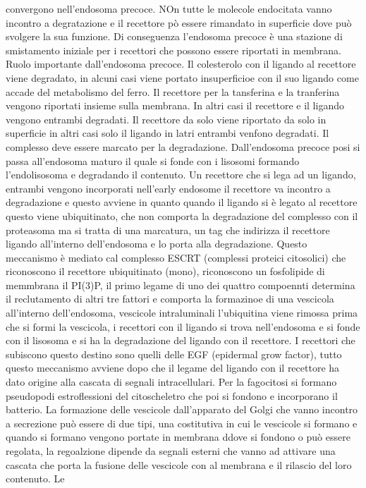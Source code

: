convergono nell'endosoma precoce. NOn tutte le molecole endocitata vanno incontro a degratazione e il recettore p\`o essere rimandato in superficie dove pu\`o svolgere la sua funzione.
Di conseguenza l'endosoma precoce \`e una stazione di smistamento iniziale per i recettori che possono essere riportati in membrana. Ruolo importante dall'endosoma precoce. Il
colesterolo con il ligando al recettore viene degradato, in alcuni casi viene portato insuperficioe con il suo ligando come accade del metabolismo del ferro. Il recettore per la 
tansferina e la tranferina vengono riportati insieme sulla membrana. In altri casi il recettore e il ligando vengono entrambi degradati. Il recettore da solo viene riportato da solo
in superficie in altri casi solo il ligando in latri entrambi venfono degradati. Il complesso deve essere marcato per la degradazione. Dall'endosoma precoce posi si passa all'endosoma 
maturo il quale si fonde con i lisosomi formando l'endolisosoma e degradando il contenuto. Un recettore che si lega ad un ligando, entrambi vengono incorporati nell'early endosome il
recettore va incontro a degradazione e questo avviene in quanto quando il ligando si \`e legato al recettore questo viene ubiquitinato, che non comporta la degradazione del complesso 
con il proteasoma ma si tratta di una marcatura, un tag che indirizza il recettore ligando all'interno dell'endosoma e lo porta alla degradazione. Questo meccanismo \`e mediato cal
complesso ESCRT (complessi proteici citosolici) che riconoscono il recettore ubiquitinato (mono), riconoscono un fosfolipide di memmbrana il PI(3)P, il primo legame di uno dei quattro 
compoennti determina il reclutamento di altri tre fattori e comporta la formazinoe di una vescicola all'interno dell'endosoma, vescicole intraluminali l'ubiquitina viene rimossa prima che
si formi la vescicola, i recettori con il ligando si trova nell'endosoma e si fonde con il lisosoma e si ha la degradazione del ligando con il recettore. I recettori che subiscono questo
destino sono quelli delle EGF (epidermal grow factor), tutto questo meccanismo avviene dopo che il legame del ligando con il recettore ha dato origine alla cascata di segnali 
intracellulari. Per la fagocitosi si formano pseudopodi estroflessioni del citoscheletro che poi si fondono e incorporano il batterio. La formazione delle vescicole dall'apparato del
Golgi che vanno incontro a secrezione pu\`o essere di due tipi, una costitutiva in cui le vescicole si formano e quando si formano vengono portate in membrana ddove si fondono o pu\`o
essere regolata, la regoalzione dipende da segnali esterni che vanno ad attivare una cascata che porta la fusione delle vescicole con al membrana e il rilascio del loro contenuto. Le
